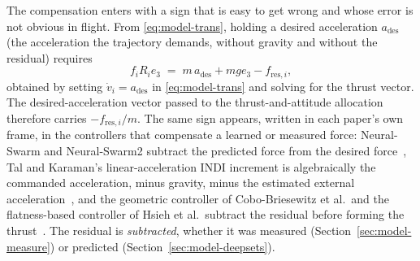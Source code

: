 The compensation enters with a sign that is easy to get wrong and whose error is not obvious in
flight. From \eqref{eq:model-trans}, holding a desired acceleration $a_{\mathrm{des}}$ (the acceleration the
trajectory demands, without gravity and without the residual) requires
%
\begin{equation}
  f_i R_i e_3 \;=\; m\,a_{\mathrm{des}} + m g e_3 - f_{\mathrm{res},i},
  \label{eq:model-sign}
\end{equation}
%
obtained by setting $\dot v_i = a_{\mathrm{des}}$ in \eqref{eq:model-trans} and solving for the
thrust vector. The desired-acceleration vector passed to the thrust-and-attitude allocation
therefore carries $-f_{\mathrm{res},i}/m$. The same sign appears, written in each paper's own frame,
in the controllers that compensate a learned or measured force: Neural-Swarm and Neural-Swarm2
subtract the predicted force from the desired
force~\cite{shi2020neuralswarm,shi2022neuralswarm2}, Tal and Karaman's linear-acceleration INDI
increment is algebraically the commanded acceleration, minus gravity, minus the estimated external
acceleration~\cite{tal2018indi}, and the geometric controller of Cobo-Briesewitz et al.\ and the
flatness-based controller of Hsieh et al.\ subtract the residual before forming the
thrust~\cite{cobobriesewitz2026lindi,hsieh2026flatness}.
The residual is \emph{subtracted}, whether it was measured
(Section~\ref{sec:model-measure}) or predicted (Section~\ref{sec:model-deepsets}).

